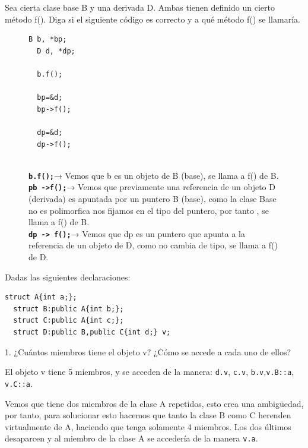\newpage
{} Sea cierta clase base B y una derivada D. Ambas tienen definido un cierto método f(). Diga si el siguiente código es correcto y a qué método f() se llamaría.
\begin{figure}[h]
  \begin{minipage}{0.2\textwidth}
    \begin{lstlisting}[frame = single]
  B b, *bp;
  D d, *dp;

  b.f();

  bp=&d;
  bp->f();

  dp=&d;
  dp->f();  
    \end{lstlisting}
  \end{minipage}
\hfill
\begin{minipage}{0.75\textwidth}
 \\
  \textbf{\texttt{b.f();}}→ Vemos que b es un objeto de B (base), se llama a f() de B. \\
  \textbf{\texttt{pb ->f();}}→ Vemos que previamente una referencia de un objeto D (derivada) es apuntada por un puntero B (base), como la clase Base no es polimorfica nos fijamos en el tipo del puntero, por tanto , se llama a f() de B. \\
  \textbf{\texttt{dp -> f();}}→ Vemos que dp es un puntero que apunta a la referencia de un objeto de D, como no cambia de tipo, se llama a f() de D.\\

\end{minipage}
\end{figure}

 Dadas las siguientes declaraciones:
\begin{lstlisting}[frame = single]
  struct A{int a;};
  struct B:public A{int b;};
  struct C:public A{int c;};
  struct D:public B,public C{int d;} v;
\end{lstlisting}

1. ¿Cuántos miembros tiene el objeto v? ¿Cómo se accede a cada uno de ellos?

El objeto v tiene 5 miembros, y se acceden de la manera: \texttt{d.v}, \texttt{c.v}, \texttt{b.v},\texttt{v.B::a}, \texttt{v.C::a}.

Vemos que tiene dos miembros de la clase A repetidos, esto crea una ambigüedad, por tanto, para solucionar esto hacemos que tanto la clase B como C herenden virtualmente de A, haciendo que tenga solamente 4 miembros. Los dos últimos desaparcen y al miembro de la clase A se accedería de la manera \texttt{v.a}.